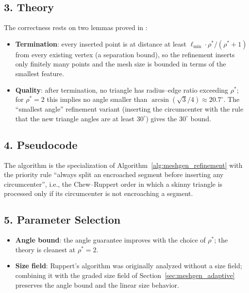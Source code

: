 \subsection{3. Theory}

The correctness rests on two lemmas proved in \cite{ruppert1995,
shewchuk2002}:
\begin{itemize}
  \item \textbf{Termination}: every inserted point is at distance at least
    $\ell_{\min} \cdot \rho^* / (\rho^* + 1)$ from every existing vertex
    (a separation bound), so the refinement inserts only finitely many
    points and the mesh size is bounded in terms of the smallest feature.
  \item \textbf{Quality}: after termination, no triangle has radius--edge
    ratio exceeding $\rho^*$; for $\rho^* = 2$ this implies no angle
    smaller than $\arcsin(\sqrt{3}/4) \approx 20.7^\circ$. The
    ``smallest angle'' refinement variant (inserting the circumcenter with
    the rule that the new triangle angles are at least $30^\circ$) gives
    the $30^\circ$ bound.
\end{itemize}

\subsection{4. Pseudocode}

The algorithm is the specialization of
Algorithm~\ref{alg:meshgen_refinement} with the priority rule ``always
split an encroached segment before inserting any circumcenter'', i.e., the
Chew--Ruppert order in which a skinny triangle is processed only if its
circumcenter is not encroaching a segment.

\subsection{5. Parameter Selection}

\begin{itemize}
\item \textbf{Angle bound}: the angle guarantee improves with the choice of
  $\rho^*$; the theory is cleanest at $\rho^* = 2$.
\item \textbf{Size field}: Ruppert's algorithm was originally analyzed
  without a size field; combining it with the graded size field of
  Section~\ref{sec:meshgen_adaptive} preserves the angle bound and the
  linear size behavior.
\end{itemize}

